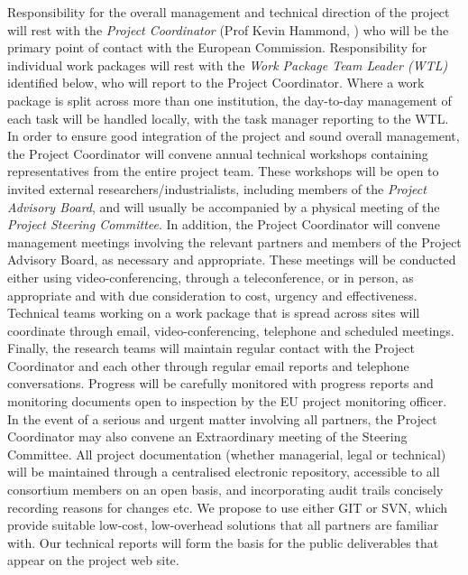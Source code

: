 \documentclass[a4paper,11pt]{article}
\begin{document}
Responsibility for the overall management and technical
direction of the project will rest with the \emph{Project Coordinator}
(Prof Kevin Hammond, \SA{}) who will be the primary point of
contact with the European Commission. Responsibility for
individual work packages will rest with the \emph{Work Package Team
Leader (WTL)} identified below, who will report to the Project Coordinator.
Where a work package is split across more than one
institution, the day-to-day management of each task will be handled
locally, with the task manager reporting to the WTL.   
%
In order to ensure good integration of the project and sound
overall management, the Project Coordinator will convene
annual technical workshops containing representatives from
the entire project team.   These workshops will be open to
invited external researchers/industrialists, including members
of the \emph{Project Advisory Board}, and will usually be
accompanied by a physical meeting of the \emph{Project Steering Committee}. In
addition, the Project Coordinator will convene management
meetings involving the relevant partners and members of the
Project Advisory Board, as necessary and appropriate. These meetings will be
conducted either using video-conferencing, through a
teleconference, or in person, as appropriate and with due consideration to
cost, urgency and effectiveness.  Technical teams
working on a work package that is spread across sites will
coordinate through email, video-conferencing, telephone and
scheduled meetings.  Finally, the research teams will maintain
regular contact with the Project Coordinator and each other
through regular email reports and telephone conversations.
Progress will be carefully monitored with progress reports and
monitoring documents open to inspection by the EU project
monitoring officer. In the event of a serious and urgent matter
involving all partners, the Project Coordinator may also
convene an Extraordinary meeting of the Steering Committee.
%
All project documentation (whether managerial, legal or
technical) will be maintained through a centralised electronic
repository, accessible to all consortium members on an open
basis, and incorporating audit trails concisely recording
reasons for changes etc.  We propose to use either GIT or SVN,
which provide suitable low-cost,  low-overhead solutions that all partners are
familiar with.  Our technical reports will form the basis for
the public deliverables that appear on the project web site.
\end{document}
